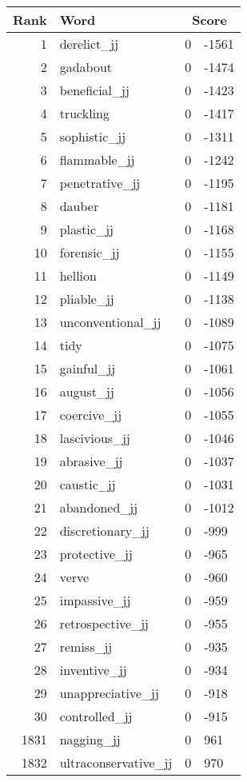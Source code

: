 \begin{longtable}[!htbp]{| rlr@{.}l |}
    \hline
    \textbf{Rank} & \textbf{Word} & \multicolumn{2}{c|}{\textbf{Score}} \\
    \hline
    \endhead
    1 & derelict\_jj & 0 & -1561 \\
    2 & gadabout & 0 & -1474 \\
    3 & beneficial\_jj & 0 & -1423 \\
    4 & truckling & 0 & -1417 \\
    5 & sophistic\_jj & 0 & -1311 \\
    6 & flammable\_jj & 0 & -1242 \\
    7 & penetrative\_jj & 0 & -1195 \\
    8 & dauber & 0 & -1181 \\
    9 & plastic\_jj & 0 & -1168 \\
    10 & forensic\_jj & 0 & -1155 \\
    11 & hellion & 0 & -1149 \\
    12 & pliable\_jj & 0 & -1138 \\
    13 & unconventional\_jj & 0 & -1089 \\
    14 & tidy & 0 & -1075 \\
    15 & gainful\_jj & 0 & -1061 \\
    16 & august\_jj & 0 & -1056 \\
    17 & coercive\_jj & 0 & -1055 \\
    18 & lascivious\_jj & 0 & -1046 \\
    19 & abrasive\_jj & 0 & -1037 \\
    20 & caustic\_jj & 0 & -1031 \\
    21 & abandoned\_jj & 0 & -1012 \\
    22 & discretionary\_jj & 0 & -999 \\
    23 & protective\_jj & 0 & -965 \\
    24 & verve & 0 & -960 \\
    25 & impassive\_jj & 0 & -959 \\
    26 & retrospective\_jj & 0 & -955 \\
    27 & remiss\_jj & 0 & -935 \\
    28 & inventive\_jj & 0 & -934 \\
    29 & unappreciative\_jj & 0 & -918 \\
    30 & controlled\_jj & 0 & -915 \\
    1831 & nagging\_jj & 0 & 961 \\
    1832 & ultraconservative\_jj & 0 & 970 \\

\end{longtable}
